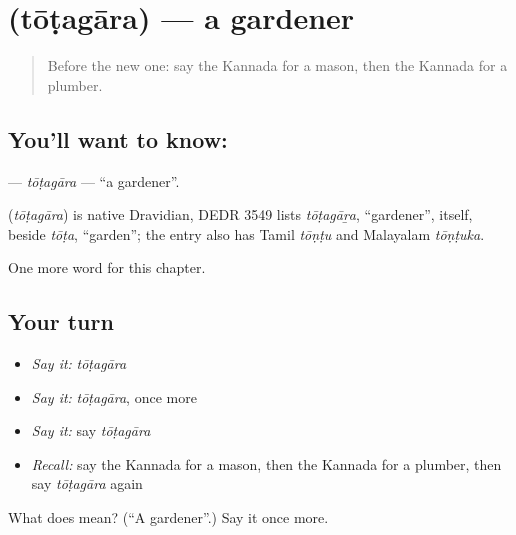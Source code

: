 \section[\texorpdfstring{\kn{ತೋಟಗಾರ} (tōṭagāra)}{ತೋಟಗಾರ (tōṭagāra)}]{ (tōṭagāra) — a gardener}

\label{lesson:KA-C306-totagara}



\begin{quote}
Before the new one: say the Kannada for a mason, then the Kannada for a plumber.
\end{quote}

\subsection*{You'll want to know: }
\textbf{} — \emph{tōṭagāra} — \textquotedblleft{}a gardener\textquotedblright{}.

\begin{cousinweb}
\textbf{} (\emph{tōṭagāra}) is native Dravidian, DEDR 3549 lists \emph{tōṭagāṟa}, \textquotedblleft{}gardener\textquotedblright{}, itself, beside \emph{tōṭa}, \textquotedblleft{}garden\textquotedblright{}; the entry also has Tamil \emph{tōṇṭu} and Malayalam \emph{tōṇṭuka}.
\end{cousinweb}

\begin{grammarlens}[title={What you've built}]
One more word for this chapter.
\end{grammarlens}

\subsection*{Your turn}
\begin{itemize}
\raggedright
  \item \emph{Say it:} \emph{tōṭagāra}
  \item \emph{Say it:} \emph{tōṭagāra}, once more
  \item \emph{Say it:} say \emph{tōṭagāra}
  \item \emph{Recall:} say the Kannada for a mason, then the Kannada for a plumber, then say \emph{tōṭagāra} again
\end{itemize}

\begin{tcolorbox}[breakable,colback=teal!4,colframe=teal!35!black,title={Before you move on}]
What does  mean? (\textquotedblleft{}A gardener\textquotedblright{}.) Say it once more.
\end{tcolorbox}
